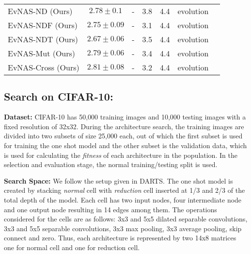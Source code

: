 \documentclass[final]{cvpr}
\begin{document}
\begin{table*}[t]
\begin{tabular}{lcccccc}
    EvNAS-ND (Ours)                   & $2.78\pm0.1$ & - & 3.8 & 4.4 & evolution\\
    EvNAS-NDF (Ours)                   & $2.75\pm0.09$ & - & 3.1 & 4.4 & evolution\\
    EvNAS-NDT (Ours)                   & $2.67\pm0.06$ & - & 3.5 & 4.4 & evolution\\
    EvNAS-Mut (Ours)                   & $2.79\pm0.06$ & - & 3.4 & 4.4 & evolution\\
    EvNAS-Cross (Ours)                   & $2.81\pm0.08$ & - & 3.2 & 4.4 & evolution\\
    
    \end{tabular}
\end{table*}

\subsection{Search on CIFAR-10:} \label{res:cifar10}
\textbf{Dataset:} CIFAR-10 \cite{krizhevsky2009learning} has 50,000 training
images and 10,000 testing images with a fixed resolution of 32x32. During
the architecture search, the training images are divided into two subsets of size
25,000 each, out of which the first subset is used for training the one shot model
and the other subset is the validation data, which is used for calculating the \textit{fitness}
of each architecture in the population. In the selection and evaluation stage, the normal
training/testing split is used.

\textbf{Search Space:} We follow the setup given in DARTS\cite{liu2018darts2}. The one shot model is
created by stacking \textit{normal} cell with \textit{reduction} cell inserted at 1/3 and 2/3 of the
total depth of the model. Each cell has two input nodes, four intermediate node and one output
node resulting in 14 edges among them. The operations considered for the cells are as follows: 
3x3 and 5x5 dilated separable convolutions, 3x3 and 5x5 separable convolutions, 3x3 max pooling, 
3x3 average pooling, skip connect and zero. Thus, each architecture is represented by two
14x8 matrices one for normal cell and one for reduction cell.
\end{document}
